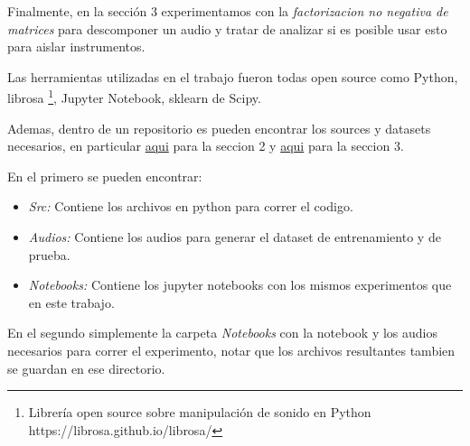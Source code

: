 Finalmente, en la secci\'on 3 experimentamos con la \textit{factorizacion no negativa de matrices} para descomponer un audio y tratar de analizar si es posible usar esto para aislar instrumentos. 

Las herramientas utilizadas en el trabajo fueron todas open source como Python, librosa \footnote{Librer\'ia open source sobre manipulaci\'on de sonido en Python https://librosa.github.io/librosa/ }, Jupyter Notebook, sklearn de Scipy.

Ademas, dentro de un repositorio es pueden encontrar los sources y datasets necesarios, en particular \href{https://github.com/ilebrero/Procesamiento-de-senales/tree/master/Non-negative-matrices/Caracterizacion%20de%20Instrumentos}{aqui} para la seccion 2 y \href{https://github.com/ilebrero/Procesamiento-de-senales/tree/master/Non-negative-matrices/Separacion_de_audios}{aqui} para la seccion 3. 

En el primero se pueden encontrar:
    
\begin{itemize}
    \item \textit{Src:} Contiene los archivos en python para correr el codigo.
    \item \textit{Audios:} Contiene los audios para generar el dataset de entrenamiento y de prueba.
    \item \textit{Notebooks:} Contiene los jupyter notebooks con los mismos experimentos que en este trabajo.
\end{itemize}

En el segundo simplemente la carpeta \textit{Notebooks} con la notebook y los audios necesarios para correr el experimento, notar que los archivos resultantes tambien se guardan en ese directorio.
